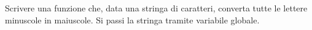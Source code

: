  Scrivere una funzione che, data una stringa di caratteri, converta tutte le lettere minuscole in maiuscole. Si passi la stringa tramite variabile globale.
